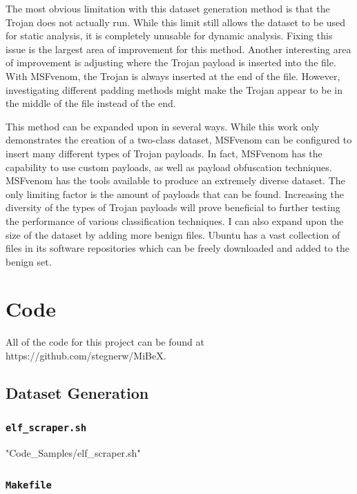 \documentclass[12pt, letterpaper, titlepage]{article}
\newcommand{\ubu}{Ubuntu}
\newcommand{\msfv}{MSFvenom}
\begin{document}
The most obvious limitation with this dataset generation method is that the Trojan does not actually run.
While this limit still allows the dataset to be used for static analysis, it is completely unusable for dynamic analysis.
Fixing this issue is the largest area of improvement for this method.
Another interesting area of improvement is adjusting where the Trojan payload is inserted into the file.
With \msfv{}, the Trojan is always inserted at the end of the file.
However, investigating different padding methods might make the Trojan appear to be in the middle of the file instead of the end.

This method can be expanded upon in several ways.
While this work only demonstrates the creation of a two-class dataset, \msfv{} can be configured to insert many different types of Trojan payloads.
In fact, \msfv{} has the capability to use custom payloads, as well as payload obfuscation techniques.
\msfv{} has the tools available to produce an extremely diverse dataset.
The only limiting factor is the amount of payloads that can be found.
Increasing the diversity of the types of Trojan payloads will prove beneficial to further testing the performance of various classification techniques.
I can also expand upon the size of the dataset by adding more benign files.
\ubu{} has a vast collection of files in its software repositories which can be freely downloaded and added to the benign set.

\pagebreak




\pagebreak

\appendix
\section{Code}
All of the code for this project can be found at https://github.com/stegnerw/MiBeX.

\subsection{Dataset Generation}

\cprotect\subsubsection{\verb|elf_scraper.sh|}


{"Code_Samples/elf_scraper.sh"}

\cprotect\subsubsection{\verb|Makefile|}
\end{document}
